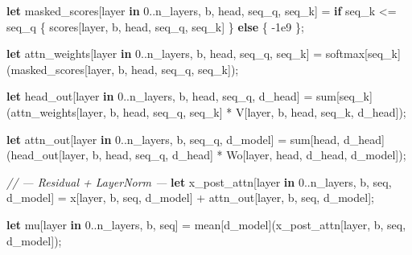 \documentclass[11pt,]{article}
\newenvironment{Shaded}{}{}
\newcommand{\CommentTok}[1]{\textcolor[rgb]{0.38,0.63,0.69}{\textit{#1}}}
\newcommand{\DecValTok}[1]{\textcolor[rgb]{0.25,0.63,0.44}{#1}}
\newcommand{\KeywordTok}[1]{\textcolor[rgb]{0.00,0.44,0.13}{\textbf{#1}}}
\newcommand{\NormalTok}[1]{#1}
\newcommand{\OperatorTok}[1]{\textcolor[rgb]{0.40,0.40,0.40}{#1}}
\begin{document}
\begin{Shaded}
\begin{Highlighting}[]
\KeywordTok{let}\NormalTok{ masked_scores}\OperatorTok{[}\NormalTok{layer }\KeywordTok{in} \DecValTok{0.}\NormalTok{.n_layers, b, head, seq_q, seq_k}\OperatorTok{]}\NormalTok{ =}
    \KeywordTok{if}\NormalTok{ seq_k <= seq_q}
        \OperatorTok{\{}\NormalTok{ scores}\OperatorTok{[}\NormalTok{layer, b, head, seq_q, seq_k}\OperatorTok{]} \OperatorTok{\}}
        \KeywordTok{else} \OperatorTok{\{}\NormalTok{ -}\DecValTok{1}\NormalTok{e9 }\OperatorTok{\}}\NormalTok{;}

\KeywordTok{let}\NormalTok{ attn_weights}\OperatorTok{[}\NormalTok{layer }\KeywordTok{in} \DecValTok{0.}\NormalTok{.n_layers, b, head, seq_q, seq_k}\OperatorTok{]}\NormalTok{ =}
\NormalTok{    softmax}\OperatorTok{[}\NormalTok{seq_k}\OperatorTok{]}\NormalTok{(masked_scores}\OperatorTok{[}\NormalTok{layer, b, head, seq_q, seq_k}\OperatorTok{]}\NormalTok{);}

\KeywordTok{let}\NormalTok{ head_out}\OperatorTok{[}\NormalTok{layer }\KeywordTok{in} \DecValTok{0.}\NormalTok{.n_layers, b, head, seq_q, d_head}\OperatorTok{]}\NormalTok{ =}
\NormalTok{    sum}\OperatorTok{[}\NormalTok{seq_k}\OperatorTok{]}\NormalTok{(attn_weights}\OperatorTok{[}\NormalTok{layer, b, head, seq_q, seq_k}\OperatorTok{]}\NormalTok{ *}
\NormalTok{                V}\OperatorTok{[}\NormalTok{layer, b, head, seq_k, d_head}\OperatorTok{]}\NormalTok{);}

\KeywordTok{let}\NormalTok{ attn_out}\OperatorTok{[}\NormalTok{layer }\KeywordTok{in} \DecValTok{0.}\NormalTok{.n_layers, b, seq_q, d_model}\OperatorTok{]}\NormalTok{ =}
\NormalTok{    sum}\OperatorTok{[}\NormalTok{head, d_head}\OperatorTok{]}\NormalTok{(head_out}\OperatorTok{[}\NormalTok{layer, b, head, seq_q, d_head}\OperatorTok{]}\NormalTok{ *}
\NormalTok{                       Wo}\OperatorTok{[}\NormalTok{layer, head, d_head, d_model}\OperatorTok{]}\NormalTok{);}

\CommentTok{// --- Residual + LayerNorm ---}
\KeywordTok{let}\NormalTok{ x_post_attn}\OperatorTok{[}\NormalTok{layer }\KeywordTok{in} \DecValTok{0.}\NormalTok{.n_layers, b, seq, d_model}\OperatorTok{]}\NormalTok{ =}
\NormalTok{    x}\OperatorTok{[}\NormalTok{layer, b, seq, d_model}\OperatorTok{]}\NormalTok{ + attn_out}\OperatorTok{[}\NormalTok{layer, b, seq, d_model}\OperatorTok{]}\NormalTok{;}

\KeywordTok{let}\NormalTok{ mu}\OperatorTok{[}\NormalTok{layer }\KeywordTok{in} \DecValTok{0.}\NormalTok{.n_layers, b, seq}\OperatorTok{]}\NormalTok{ =}
\NormalTok{    mean}\OperatorTok{[}\NormalTok{d_model}\OperatorTok{]}\NormalTok{(x_post_attn}\OperatorTok{[}\NormalTok{layer, b, seq, d_model}\OperatorTok{]}\NormalTok{);}


\end{Highlighting}
\end{Shaded}
\end{document}
